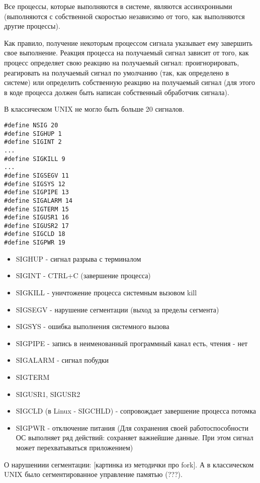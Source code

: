 \documentclass[a4paper, 12pt]{report}
\begin{document}
	Все процессы, которые выполняются в системе, являются ассинхронными (выполняются с собственной скоростью независимо от того, как выполняются другие процессы).
	
	Как правило, получение некоторым процессом сигнала указывает ему завершить свое выполнение. Реакция процесса на получаемый сигнал зависит от того, как процесс определяет свою реакцию на получаемый сигнал: проигнорировать, реагировать на получаемый сигнал по умолчанию (так, как определено в системе) или  определить собственную реакцию на получаемый сигнал (для этого в коде процесса должен быть написан собственный обработчик сигнала).
	
	В классическом UNIX не могло быть больше 20 сигналов.
	
	\begin{lstlisting}
#define NSIG 20
#define SIGHUP 1
#define SIGINT 2
...
#define SIGKILL 9
...
#define SIGSEGV 11
#define SIGSYS 12
#define SIGPIPE 13
#define SIGALARM 14
#define SIGTERM 15
#define SIGUSR1 16
#define SIGUSR2 17
#define SIGCLD 18
#define SIGPWR 19
	\end{lstlisting}
	
	\begin{itemize}
		\item SIGHUP - сигнал разрыва с терминалом
		\item SIGINT - CTRL+C (завершение процесса)
		\item SIGKILL - уничтожение процесса системным вызовом kill
		\item SIGSEGV - нарушение сегментации (выход за пределы сегмента)
		\item SIGSYS - ошибка выполнения системного вызова
		\item SIGPIPE - запись в неименованный программный канал есть, чтения - нет
		\item SIGALARM - сигнал побудки
		\item SIGTERM
		\item SIGUSR1, SIGUSR2
		\item SIGCLD (в Linux - SIGCHLD) - сопровождает завершение процесса потомка
		\item SIGPWR - отключение питания (Для сохранения своей работоспособности ОС выполняет ряд действий: сохраняет важнейшие данные. При этом сигнал может перехватываться приложением)
	\end{itemize}

	О нарушениии сегментации: [картинка из методички про fork]. А в классическом UNIX было сегментированное управление памятью (???).
	
\end{document}
